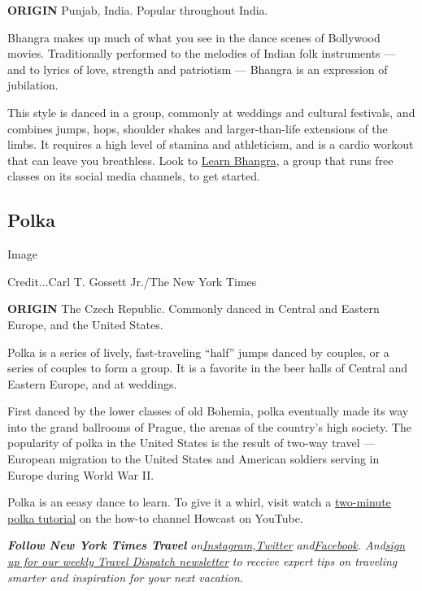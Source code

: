 \textbf{ORIGIN} Punjab, India. Popular throughout India.

Bhangra makes up much of what you see in the dance scenes of Bollywood
movies. Traditionally performed to the melodies of Indian folk
instruments --- and to lyrics of love, strength and patriotism ---
Bhangra is an expression of jubilation.

This style is danced in a group, commonly at weddings and cultural
festivals, and combines jumps, hops, shoulder shakes and
larger-than-life extensions of the limbs. It requires a high level of
stamina and athleticism, and is a cardio workout that can leave you
breathless. Look to \href{https://learnbhangra.com/}{Learn Bhangra}, a
group that runs free classes on its social media channels, to get
started.

\hypertarget{polka}{%
\subsection{Polka}\label{polka}}

Image

Credit...Carl T. Gossett Jr./The New York Times

\textbf{ORIGIN} The Czech Republic. Commonly danced in Central and
Eastern Europe, and the United States.

Polka is a series of lively, fast-traveling ``half'' jumps danced by
couples, or a series of couples to form a group. It is a favorite in the
beer halls of Central and Eastern Europe, and at weddings.

First danced by the lower classes of old Bohemia, polka eventually made
its way into the grand ballrooms of Prague, the arenas of the country's
high society. The popularity of polka in the United States is the result
of two-way travel --- European migration to the United States and
American soldiers serving in Europe during World War II.

Polka is an eeasy dance to learn. To give it a whirl, visit watch a
\href{https://www.youtube.com/watch?v=y846w6PUmCw}{two-minute polka
tutorial} on the how-to channel Howcast on YouTube.

\emph{\textbf{Follow New York Times Travel}}
\emph{on}\href{https://www.instagram.com/nytimestravel/}{\emph{Instagram}}\emph{,}\href{https://twitter.com/nytimestravel}{\emph{Twitter}}
\emph{and}\href{https://www.facebook.com/nytimestravel/}{\emph{Facebook}}\emph{.
And}\href{https://www.nytimes.com/newsletters/traveldispatch}{\emph{sign
up for our weekly Travel Dispatch newsletter}} \emph{to receive expert
tips on traveling smarter and inspiration for your next vacation.}

